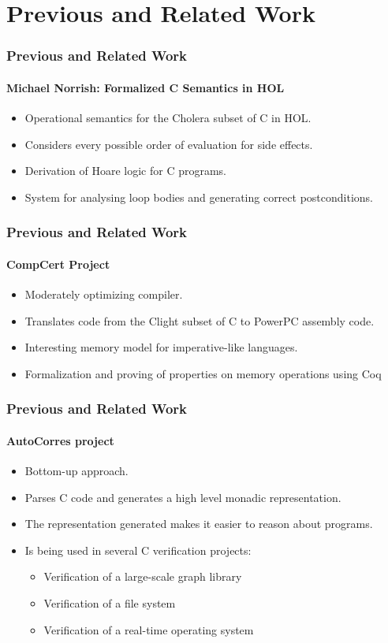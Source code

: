 \section{Previous and Related Work}


\begin{frame}
\frametitle{Previous and Related Work}
\framesubtitle{Michael Norrish: Formalized C Semantics in HOL}

\begin{itemize}
\item{Operational semantics for the Cholera subset of C in HOL.}
\item{Considers every possible order of evaluation for side effects.}
\item{Derivation of Hoare logic for C programs.}
\item{System for analysing loop bodies and generating correct postconditions.}
\end{itemize}


\end{frame}


\begin{frame}
\frametitle{Previous and Related Work}
\framesubtitle{CompCert Project}

\begin{itemize}
\item{Moderately optimizing compiler.}
\item{Translates code from the Clight subset of C to PowerPC assembly code.}
\item{Interesting memory model for imperative-like languages.}
\item{Formalization and proving of properties on memory operations using Coq}
\end{itemize}


\end{frame}


\begin{frame}
\frametitle{Previous and Related Work}
\framesubtitle{AutoCorres project}

\begin{itemize}
\item{Bottom-up approach.}
\item{Parses C code and generates a high level monadic representation.}
\item{The representation generated makes it easier to reason about programs.}
\item{Is being used in several C verification projects:}
\begin{itemize}
\item{Verification of a large-scale graph library}
\item{Verification of a file system}
\item{Verification of a real-time operating system}
\end{itemize}
\end{itemize}


\end{frame}
